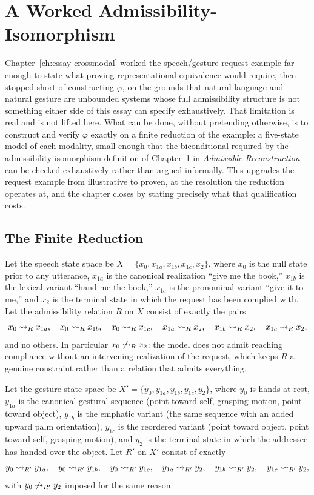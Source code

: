 \chapter{A Worked Admissibility-Isomorphism}
\label{ch:essay-worked-isomorphism}

Chapter~\ref{ch:essay-crossmodal} worked the speech/gesture request example far enough to state what proving representational equivalence would require, then stopped short of constructing $\varphi$, on the grounds that natural language and natural gesture are unbounded systems whose full admissibility structure is not something either side of this essay can specify exhaustively. That limitation is real and is not lifted here. What can be done, without pretending otherwise, is to construct and verify $\varphi$ exactly on a finite reduction of the example: a five-state model of each modality, small enough that the biconditional required by the admissibility-isomorphism definition of Chapter~1 in \emph{Admissible Reconstruction} can be checked exhaustively rather than argued informally. This upgrades the request example from illustrative to proven, at the resolution the reduction operates at, and the chapter closes by stating precisely what that qualification costs.

\section{The Finite Reduction}

Let the speech state space be $X = \{x_0, x_{1a}, x_{1b}, x_{1c}, x_2\}$, where $x_0$ is the null state prior to any utterance, $x_{1a}$ is the canonical realization ``give me the book,'' $x_{1b}$ is the lexical variant ``hand me the book,'' $x_{1c}$ is the pronominal variant ``give it to me,'' and $x_2$ is the terminal state in which the request has been complied with. Let the admissibility relation $R$ on $X$ consist of exactly the pairs
\[
x_0 \rightsquigarrow_{R} x_{1a}, \quad x_0 \rightsquigarrow_{R} x_{1b}, \quad x_0 \rightsquigarrow_{R} x_{1c}, \quad x_{1a} \rightsquigarrow_{R} x_2, \quad x_{1b} \rightsquigarrow_{R} x_2, \quad x_{1c} \rightsquigarrow_{R} x_2,
\]
and no others. In particular $x_0 \not\rightsquigarrow_{R} x_2$: the model does not admit reaching compliance without an intervening realization of the request, which keeps $R$ a genuine constraint rather than a relation that admits everything.

Let the gesture state space be $X' = \{y_0, y_{1a}, y_{1b}, y_{1c}, y_2\}$, where $y_0$ is hands at rest, $y_{1a}$ is the canonical gestural sequence (point toward self, grasping motion, point toward object), $y_{1b}$ is the emphatic variant (the same sequence with an added upward palm orientation), $y_{1c}$ is the reordered variant (point toward object, point toward self, grasping motion), and $y_2$ is the terminal state in which the addressee has handed over the object. Let $R'$ on $X'$ consist of exactly
\[
y_0 \rightsquigarrow_{R'} y_{1a}, \quad y_0 \rightsquigarrow_{R'} y_{1b}, \quad y_0 \rightsquigarrow_{R'} y_{1c}, \quad y_{1a} \rightsquigarrow_{R'} y_2, \quad y_{1b} \rightsquigarrow_{R'} y_2, \quad y_{1c} \rightsquigarrow_{R'} y_2,
\]
with $y_0 \not\rightsquigarrow_{R'} y_2$ imposed for the same reason.

